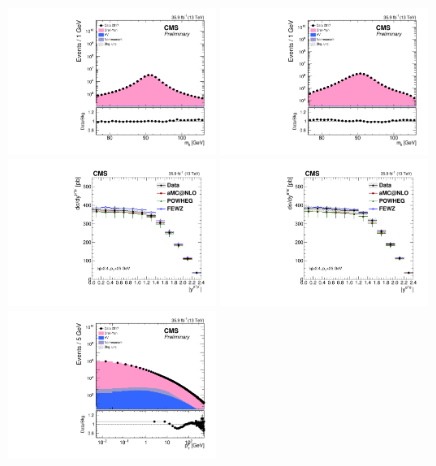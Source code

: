 \begin{figure}
	\centering
	\includegraphics[width=0.49\textwidth]{figures/zpt/zmm_mll.pdf}
	\includegraphics[width=0.49\textwidth]{figures/zpt/zee_mll.pdf}
	\includegraphics[width=0.49\textwidth]{figures/zpt/zmm_rap.pdf}
	\includegraphics[width=0.49\textwidth]{figures/zpt/zee_rap.pdf}
	\includegraphics[width=0.49\textwidth]{figures/zpt/zmm_ptll.pdf}

\end{figure}
